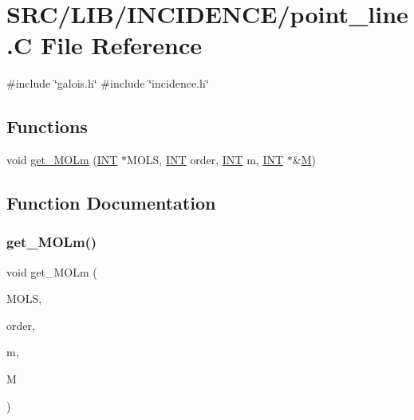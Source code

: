 \hypertarget{point__line_8_c}{}\section{S\+R\+C/\+L\+I\+B/\+I\+N\+C\+I\+D\+E\+N\+C\+E/point\+\_\+line.C File Reference}
\label{point__line_8_c}
{\ttfamily \#include \char`\"{}galois.\+h\char`\"{}}\newline
{\ttfamily \#include \char`\"{}incidence.\+h\char`\"{}}\newline
\subsection*{Functions}
\begin{DoxyCompactItemize}
\item 
void \mbox{\hyperlink{point__line_8_c_aaf6bc7deaefcdf4e19bbe121012735f9}{get\+\_\+\+M\+O\+Lm}} (\mbox{\hyperlink{galois_8h_a09fddde158a3a20bd2dcadb609de11dc}{I\+NT}} $\ast$M\+O\+LS, \mbox{\hyperlink{galois_8h_a09fddde158a3a20bd2dcadb609de11dc}{I\+NT}} order, \mbox{\hyperlink{galois_8h_a09fddde158a3a20bd2dcadb609de11dc}{I\+NT}} m, \mbox{\hyperlink{galois_8h_a09fddde158a3a20bd2dcadb609de11dc}{I\+NT}} $\ast$\&\mbox{\hyperlink{plane__search_8_c_ad2d23ebd03187a91edd45b1d5e496265}{M}})
\end{DoxyCompactItemize}


\subsection{Function Documentation}
\mbox{\label{point__line_8_c_aaf6bc7deaefcdf4e19bbe121012735f9}} 
\subsubsection{\texorpdfstring{get\+\_\+\+M\+O\+Lm()}{get\_MOLm()}}
{\footnotesize\ttfamily void get\+\_\+\+M\+O\+Lm (\begin{DoxyParamCaption}\item[{\mbox{\hyperlink{galois_8h_a09fddde158a3a20bd2dcadb609de11dc}{I\+NT}} $\ast$}]{M\+O\+LS,  }\item[{\mbox{\hyperlink{galois_8h_a09fddde158a3a20bd2dcadb609de11dc}{I\+NT}}}]{order,  }\item[{\mbox{\hyperlink{galois_8h_a09fddde158a3a20bd2dcadb609de11dc}{I\+NT}}}]{m,  }\item[{\mbox{\hyperlink{galois_8h_a09fddde158a3a20bd2dcadb609de11dc}{I\+NT}} $\ast$\&}]{M }\end{DoxyParamCaption})}

